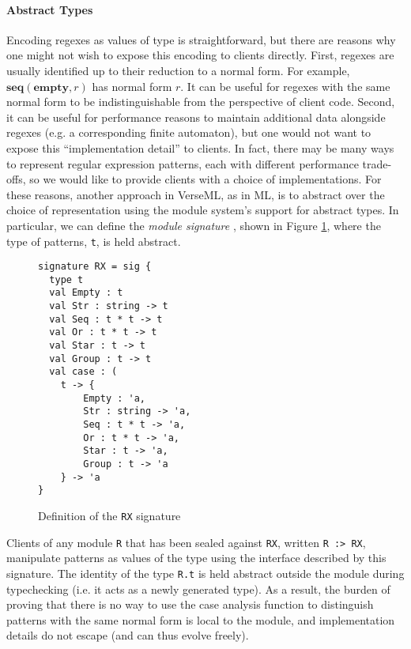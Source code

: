 {{\paragraph{Abstract Types} Encoding regexes as values of type  is straightforward, but there are reasons why one might not wish to expose this encoding to clients directly. First, regexes are usually identified up to their reduction to a normal form. For example, $\textbf{seq}(\textbf{empty}, r)$ has normal form $r$. It can be useful for regexes with the same normal form to be  indistinguishable from the perspective of client code. Second, it can be useful for performance reasons to maintain additional data alongside regexes (e.g. a corresponding finite automaton), but one would not want to expose this ``implementation detail'' to clients. In fact, there may be many ways to represent regular expression patterns, each with different performance trade-offs, so we would like to provide clients with a choice of implementations. For these reasons, another approach in VerseML, as in ML, is to abstract over the choice of representation using  the module system's support for abstract types. In particular, we can define the \emph{module signature} , shown in Figure \ref{fig:signature-RX}, where the type of patterns, \lstinline{t}, is held abstract.

\begin{figure}[ht]
\begin{lstlisting}[deletekeywords={case},numbers=none]
signature RX = sig {
  type t
  val Empty : t
  val Str : string -> t
  val Seq : t * t -> t
  val Or : t * t -> t
  val Star : t -> t
  val Group : t -> t
  val case : (
    t -> {
    	Empty : 'a,
    	Str : string -> 'a,
    	Seq : t * t -> 'a,
    	Or : t * t -> 'a,
    	Star : t -> 'a,
    	Group : t -> 'a
    } -> 'a
}
\end{lstlisting}
\caption{Definition of the \lstinline{RX} signature}
\label{fig:signature-RX}
\end{figure}

 Clients of any module \lstinline{R} that has been sealed against \lstinline{RX}, written \lstinline{R :> RX}, manipulate patterns as values of the type  using the interface described by this signature. The identity of the type \lstinline{R.t} is held abstract outside the module during typechecking (i.e. it acts as a newly generated type). As a result, the burden of proving that there is no way to use the case analysis function to distinguish patterns with the same normal form is local to the module, and implementation details do not escape (and can thus evolve freely). %

}}
